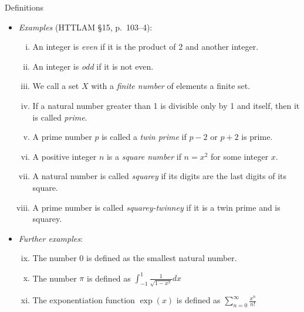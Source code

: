 \begin{frame}{Definitions}

	\begin{itemize}
		
		\item \emph{Examples} (HTTLAM \S15, p.~103--4):
	
	\begin{enumerate}[(i)]
	
		\item An integer is \emph{even} if it is the product of 2 and another integer.
		
		\item An integer is \emph{odd} if it is not even.
		
		\item We call a set $X$ with a \emph{finite number} of elements a finite set.
		
		\item If a natural number greater than 1 is divisible only by 1 and itself, then it is called \emph{prime}.
		
		\item A prime number $p$ is called a \emph{twin prime} if $p-2$ or $p+2$ is prime.
		
		\item A positive integer $n$ is a \emph{square number} if $n= x^2$ for some integer $x$.
		
		\item A natural number is called \emph{squarey} if its digits are the last digits of its square.
		
		\item A prime number is called \emph{squarey-twinney} if it is a twin prime and is squarey.
	
	\end{enumerate}
	
	\item \emph{Further examples}:
	
		\begin{enumerate}[(i)]
		\setcounter{enumi}{8}
		
			\item The number $0$ is defined as the smallest natural number.
		
			\item The number $\pi$ is defined as $\int_{-1}^{1}\frac{1}{\sqrt{1-x^2}}dx$
			
			\item The exponentiation function $\exp(x)$ is defined as $\sum_{n=0}^\infty\frac{x^n}{n!}$
		
		\end{enumerate}
	
	\end{itemize}

\end{frame}

